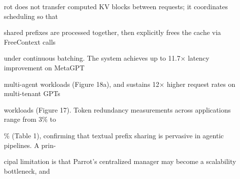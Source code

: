 \begin{flushleft}
\noindent rot does not transfer computed KV blocks between requests; it coordinates scheduling so that\par
\noindent shared prefixes are processed together, then explicitly frees the cache via FreeContext calls\par
\noindent under continuous batching. The system achieves up to 11.7× latency improvement on MetaGPT\par
\noindent multi-agent workloads (Figure 18a), and sustains 12× higher request rates on multi-tenant GPTs\par
\noindent workloads (Figure 17). Token redundancy measurements across applications range from 3\% to\par
{}\% (Table 1), confirming that textual prefix sharing is pervasive in agentic pipelines. A prin-\par
\noindent cipal limitation is that Parrot’s centralized manager may become a scalability bottleneck, and\par
\end{flushleft}
